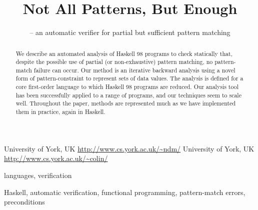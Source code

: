 \documentclass[preprint]{sigplanconf}
\begin{document}
\copyrightdata{[to be supplied]}

\titlebanner{\today{} - \currenttime{}}        %
\preprintfooter{}   %

\title{Not All Patterns, But Enough}
\subtitle{ -- an automatic verifier for partial but sufficient pattern matching}

           {University of York, UK}
           {\url{http://www.cs.york.ac.uk/~ndm/}}
           {University of York, UK}
           {\url{http://www.cs.york.ac.uk/~colin/}}

\maketitle

\begin{abstract}
We describe an automated analysis of Haskell 98 programs to check
statically that, despite the possible use of partial (or non-exhaustive)
pattern matching, no pattern-match failure can occur.  Our method is an
iterative backward analysis using a novel form of pattern-constraint
to represent sets of data values.  The analysis is defined for a
core first-order language to which Haskell 98 programs are reduced.
Our analysis tool has been successfully applied to a range of programs,
and our techniques seem to scale well.  Throughout the paper, methods
are represented much as we have implemented them in practice, again in Haskell.
\end{abstract}


\terms
languages, verification

\keywords
Haskell, automatic verification, functional programming, pattern-match errors, preconditions

\begin{comment}
\begin{code}
data Constraint = Constraint
\end{code}
\begin{code}
data Assert a = a :< Constraint
\end{code}
\begin{code}
infix  4  ==, /=
infixr 2  ||

(||) :: Bool -> Bool -> Bool
(==) :: Eq a => a -> a -> Bool
(/=) :: Eq a => a -> a -> Bool
map :: (a -> b) -> [a] -> [b]
\end{code}
\end{comment}
\end{document}
